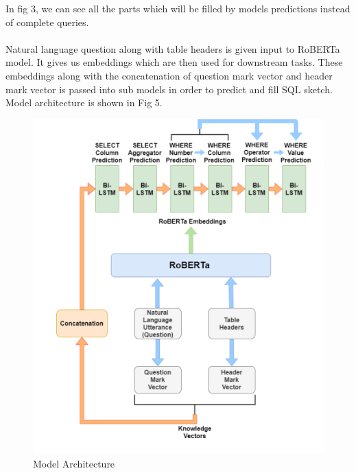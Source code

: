 \documentclass[12pt]{article}
\begin{document}
In fig 3, we can see all the parts which will be filled by models predictions instead of complete queries. 
\\
\\
Natural language question along with table headers is given input to RoBERTa model. It gives us embeddings which are then used for downstream tasks.  These embeddings along with the concatenation of question mark vector and header mark vector is passed into sub models in order to predict and fill SQL sketch. Model architecture is shown in Fig 5. 

\begin{figure}[H]
    \includegraphics[width=350pt]{model}
    \caption{Model Architecture}
    \label{fig:Model Architecture}
\end{figure}
\end{document}
